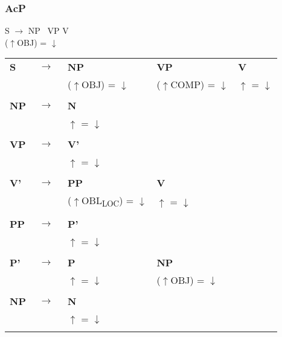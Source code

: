 \documentclass[12pt,a4paper]{article}
\begin{document}
\subsubsection{AcP}

S $\rightarrow$ NP \, VP \: V\\

($\uparrow$OBJ) = $\downarrow$\\

\renewcommand{\arraystretch}{1}  
\begin{tabular}{ l  l  l  l  l }
  \textbf{S} & $\rightarrow$ & \: \: \textbf{NP} & \: \: \: \textbf{VP} & \: \textbf{V}\\
   & $\qquad$ &($\uparrow$OBJ) = $\downarrow$ & ($\uparrow$COMP) = $\downarrow$ & $\uparrow$ = $\downarrow$\\
   $\qquad$ & $\qquad$ \\
    \textbf{NP} & $\rightarrow$ & \: \textbf{N} \\
   & $\qquad$ & $\uparrow$ = $\downarrow$\\
      $\qquad$ & $\qquad$ \\
    \textbf{VP} & $\rightarrow$ & \: \textbf{V'} \\
   & $\qquad$ & $\uparrow$ = $\downarrow$\\
   $\qquad$ & $\qquad$ \\
    \textbf{V'} & $\rightarrow$ & \: \: \textbf{PP} & \: \: \: \textbf{V} & \\
   & $\qquad$ &($\uparrow$OBL\textsubscript{LOC}) = $\downarrow$  & $\uparrow$ = $\downarrow$\\
   $\qquad$ & $\qquad$ \\
    \textbf{PP} & $\rightarrow$ & \: \: \textbf{P'} \\
	& $\qquad$   & $\uparrow$ = $\downarrow$\\
   $\qquad$ & $\qquad$ \\
    \textbf{P'} & $\rightarrow$ & \: \: \textbf{P} & \: \: \textbf{NP} \\
   & $\qquad$ & $\uparrow$ = $\downarrow$ & ($\uparrow$OBJ) = $\downarrow$ \\
   $\qquad$ & $\qquad$ \\
    \textbf{NP} & $\rightarrow$ & \: \textbf{N} \\
   & $\qquad$ & $\uparrow$ = $\downarrow$\\
      $\qquad$ & $\qquad$ \\     
\end{tabular} 
 
 
\end{document}
